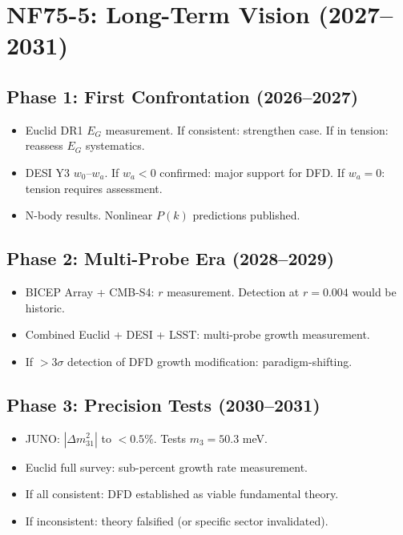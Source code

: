 \documentclass[11pt,a4paper]{article}
\begin{document}
\section{NF75-5: Long-Term Vision (2027--2031)}

\subsection{Phase 1: First Confrontation (2026--2027)}
\begin{itemize}[nosep]
\item Euclid DR1 $E_G$ measurement. If consistent: strengthen case. If in tension: reassess $E_G$ systematics.
\item DESI Y3 $w_0$--$w_a$. If $w_a < 0$ confirmed: major support for DFD. If $w_a = 0$: tension requires assessment.
\item N-body results. Nonlinear $P(k)$ predictions published.
\end{itemize}

\subsection{Phase 2: Multi-Probe Era (2028--2029)}
\begin{itemize}[nosep]
\item BICEP Array + CMB-S4: $r$ measurement. Detection at $r = 0.004$ would be historic.
\item Combined Euclid + DESI + LSST: multi-probe growth measurement.
\item If $> 3\sigma$ detection of DFD growth modification: paradigm-shifting.
\end{itemize}

\subsection{Phase 3: Precision Tests (2030--2031)}
\begin{itemize}[nosep]
\item JUNO: $|\Delta m^2_{31}|$ to $< 0.5\%$. Tests $m_3 = 50.3$ meV.
\item Euclid full survey: sub-percent growth rate measurement.
\item If all consistent: DFD established as viable fundamental theory.
\item If inconsistent: theory falsified (or specific sector invalidated).
\end{itemize}
\end{document}
